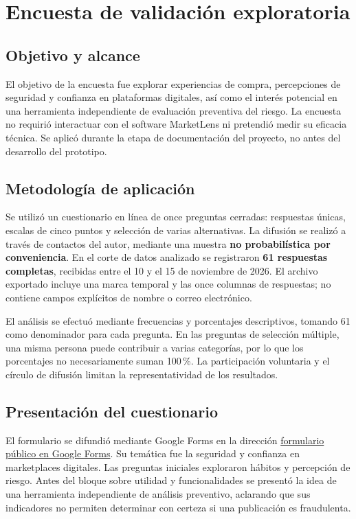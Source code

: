 \chapter{Encuesta de validación exploratoria}\label{apx:encuesta}
\section{Objetivo y alcance}

El objetivo de la encuesta fue explorar experiencias de compra, percepciones de seguridad y confianza en plataformas digitales, así como el interés potencial en una herramienta independiente de evaluación preventiva del riesgo. La encuesta no requirió interactuar con el software MarketLens ni pretendió medir su eficacia técnica. Se aplicó durante la etapa de documentación del proyecto, no antes del desarrollo del prototipo.

\section{Metodología de aplicación}

Se utilizó un cuestionario en línea de once preguntas cerradas: respuestas únicas, escalas de cinco puntos y selección de varias alternativas. La difusión se realizó a través de contactos del autor, mediante una muestra \textbf{no probabilística por conveniencia}. En el corte de datos analizado se registraron \textbf{61 respuestas completas}, recibidas entre el 10 y el 15 de noviembre de 2026. El archivo exportado incluye una marca temporal y las once columnas de respuestas; no contiene campos explícitos de nombre o correo electrónico.

El análisis se efectuó mediante frecuencias y porcentajes descriptivos, tomando 61 como denominador para cada pregunta. En las preguntas de selección múltiple, una misma persona puede contribuir a varias categorías, por lo que los porcentajes no necesariamente suman 100\,\%. La participación voluntaria y el círculo de difusión limitan la representatividad de los resultados.

\section{Presentación del cuestionario}

El formulario se difundió mediante Google Forms en la dirección \href{https://forms.gle/VtUtZDMNPApc3VeQ6}{formulario público en Google Forms}. Su temática fue la seguridad y confianza en marketplaces digitales. Las preguntas iniciales exploraron hábitos y percepción de riesgo. Antes del bloque sobre utilidad y funcionalidades se presentó la idea de una herramienta independiente de análisis preventivo, aclarando que sus indicadores no permiten determinar con certeza si una publicación es fraudulenta.

